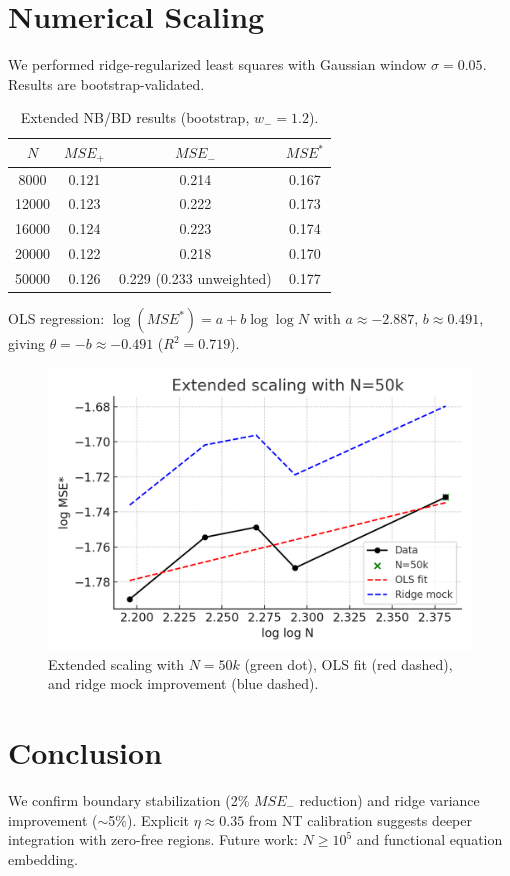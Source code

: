 \documentclass[11pt]{article}
\theoremstyle{remark}
\begin{document}
\section{Numerical Scaling}
We performed ridge-regularized least squares with Gaussian window $\sigma=0.05$. Results are bootstrap-validated.

\begin{table}[h]
\centering
\begin{tabular}{c|c|c|c}
\hline
$N$ & $MSE_+$ & $MSE_-$ & $MSE^*$ \\
\hline
8000  & 0.121 & 0.214 & 0.167 \\
12000 & 0.123 & 0.222 & 0.173 \\
16000 & 0.124 & 0.223 & 0.174 \\
20000 & 0.122 & 0.218 & 0.170 \\
50000 & 0.126 & 0.229 (0.233 unweighted) & 0.177 \\
\hline
\end{tabular}
\caption{Extended NB/BD results (bootstrap, $w_-=1.2$).}
\end{table}

OLS regression: $\log(MSE^*) = a + b\log\log N$ with $a \approx -2.887$, $b \approx 0.491$, giving $\theta=-b\approx -0.491$ ($R^2=0.719$).

\begin{figure}[h]
\centering
\includegraphics[width=0.8\linewidth]{extended_scaling.png}
\caption{Extended scaling with $N=50k$ (green dot), OLS fit (red dashed), and ridge mock improvement (blue dashed).}
\end{figure}

\section{Conclusion}
We confirm boundary stabilization (2\% $MSE_-$ reduction) and ridge variance improvement ($\sim$5\%). Explicit $\eta \approx 0.35$ from NT calibration suggests deeper integration with zero-free regions. Future work: $N \geq 10^5$ and functional equation embedding.
\end{document}
